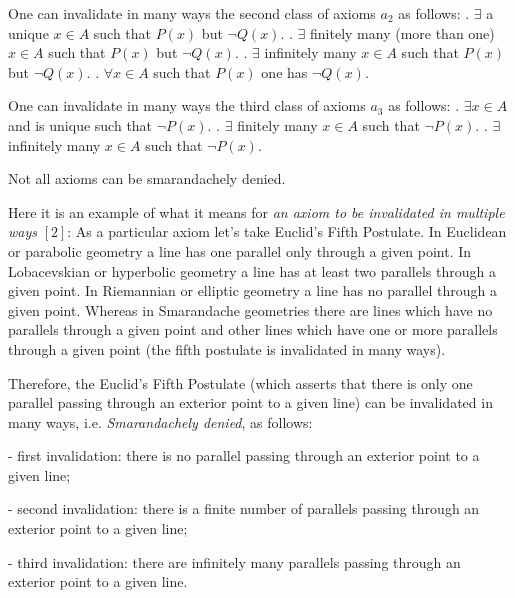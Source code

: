 \documentclass[12pt]{article}
\begin{document}
One can invalidate in many ways the second class of axioms $a_2$ as follows:
.  \indent $\exists$ a unique $x \in A$ such that $\textit{P}(x)$ but $\neg \textit{Q}(x)$.
.  \indent $\exists$ finitely many (more than one) $x \in A$ such that $\textit{P}(x)$ but $\neg \textit{Q}(x)$.
. \indent $\exists$ infinitely many $x \in A$ such that $\textit{P}(x)$ but $\neg \textit{Q}(x)$.
. \indent $\forall x \in A$ such that $\textit{P}(x)$ one has $\neg \textit{Q}(x)$.

One can invalidate in many ways the third class of axioms $a_3$ as follows:
. \indent $\exists x \in A$ and is unique such that $\neg \textit{P}(x)$.
. \indent $\exists$ finitely many $x \in A$ such that $\neg \textit{P}(x)$.
. \indent $\exists$ infinitely many $x \in A$ such that $\neg \textit{P}(x)$.

Not all axioms can be smarandachely denied. 

Here it is an example of what it means for \emph{an axiom to be invalidated in multiple ways} $[2]$:
As a particular axiom let's take Euclid's Fifth Postulate. In Euclidean or parabolic geometry a line has one parallel only through a given point. In Lobacevskian or hyperbolic geometry a line has at least two parallels through a given point. In Riemannian or elliptic geometry a line has no parallel through a given point. Whereas in Smarandache geometries there are lines which have no parallels through a given point and other lines which have one or more parallels through a given point (the fifth postulate is invalidated in many ways).

Therefore, the Euclid's Fifth Postulate (which asserts that there is only one parallel passing through an exterior point to a given line) can be invalidated in many ways, i.e. \emph{Smarandachely denied}, as follows:

- first invalidation: there is no parallel passing through an exterior point to a given line;

- second invalidation: there is a finite number of parallels passing through an exterior point to a given line;

- third invalidation: there are infinitely many parallels passing through an exterior point to a given line.
 
\end{document}
